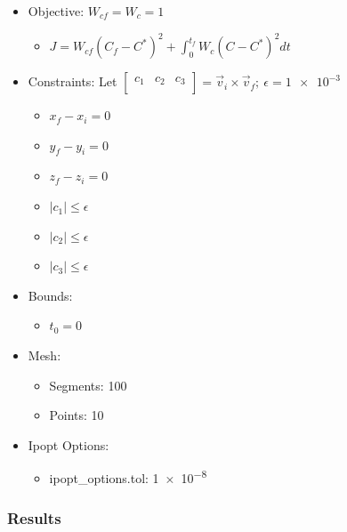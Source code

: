 \documentclass{article}
\begin{document}
\begin{itemize}
    \item Objective: $W_{cf} = W_c = 1$
    \begin{itemize}
        \item $J = W_{cf}\left(C_f - C^*\right)^2 + \int_{0}^{t_f}{W_c\left(C - C^*\right)^2dt}$
    \end{itemize}
    \item Constraints: Let $\left[\begin{matrix}c_1&c_2&c_3\\\end{matrix}\right] = \vec{v}_i\times\vec{v}_f;\ \epsilon = \num{1e-3}$
    \begin{itemize}
        \item $x_f - x_i = 0$
        \item $y_f - y_i = 0$
        \item $z_f - z_i = 0$
        \item $\left|c_1\right| \leq \epsilon$
        \item $\left|c_2\right| \leq \epsilon$
        \item $\left|c_3\right| \leq \epsilon$
    \end{itemize}
    \item Bounds:
    \begin{itemize}
        \item $t_0 = 0$
    \end{itemize}
    \item Mesh:
    \begin{itemize}
        \item Segments: 100
        \item Points: 10
    \end{itemize}
    \item Ipopt Options:
    \begin{itemize}
        \item ipopt\_options.tol: \num{1e-8}
    \end{itemize}
\end{itemize}

\subsubsection{Results}
\end{document}
